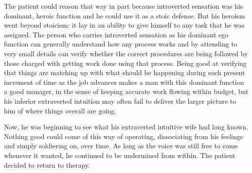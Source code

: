 \begin{enumerate}
The patient could reason that way in part because introverted sensation was his
dominant, heroic function and he could use it as a stoic defense. But his
heroism went beyond stoicism: it lay in an ability to give himself to any task
that he was assigned. The person who carries introverted sensation as his
dominant ego function can generally understand how any process works and by
attending to very small details can verify whether the correct procedures are
being followed by those charged with getting work done using that process.
Being good at verifying that things are matching up with what should be
happening during each present increment of time as the job advances makes a man
with this dominant function a good manager, in the sense of keeping accurate
work flowing within budget, but his inferior extraverted intuition may often
fail to deliver the larger picture to him of where things overall are going.

Now, he was beginning to see what his extraverted intuitive wife had long
known. Nothing good could come of this way of operating, dissociating from his
feelings and simply soldiering on, over time. As long as the voice was still
free to come whenever it wanted, he continued to be undermined from within. The
patient decided to return to therapy.


\end{enumerate}
